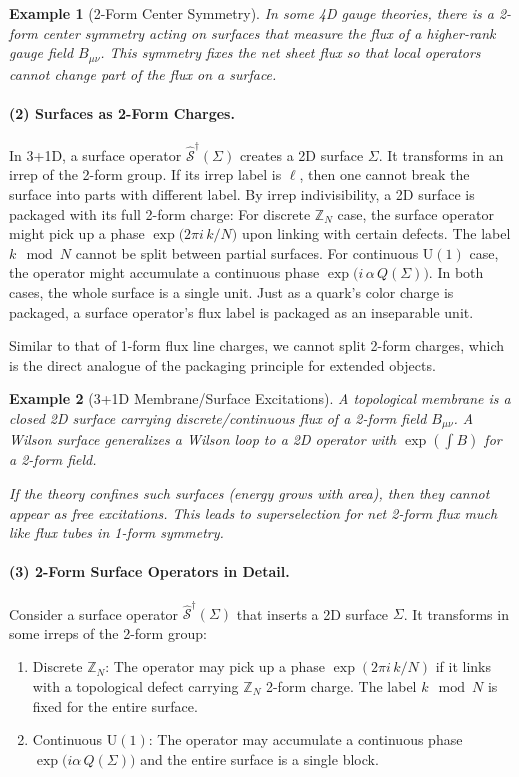 \documentclass[12pt,a4paper]{article}
\newtheorem{example}{Example}
\begin{document}
\begin{example}[2-Form Center Symmetry]
	In some 4D gauge theories, there is a 2-form center symmetry acting on surfaces that measure the flux of a higher-rank gauge field $B_{\mu\nu}$.
	This symmetry fixes the net sheet flux so that local operators cannot change part of the flux on a surface.
\end{example}


\paragraph{(2) Surfaces as 2-Form Charges.}
In 3+1D, a surface operator $\hat{\mathcal{S}}^\dagger(\Sigma)$ creates a 2D surface $\Sigma$.
It transforms in an irrep of the 2-form group.
If its irrep label is $\ell$, then one cannot break the surface into parts with different label.
By irrep indivisibility, a 2D surface is packaged with its full 2-form charge:
For discrete $\mathbb{Z}_N$ case, the surface operator might pick up a phase $\exp\bigl(2\pi i\,k/N\bigr)$ upon linking with certain defects.
The label $k \mod N$ cannot be split between partial surfaces.  
For continuous $\mathrm{U}(1)$ case, the operator might accumulate a continuous phase $\exp\bigl(i\,\alpha\,Q(\Sigma)\bigr)$.
In both cases, the whole surface is a single unit.
Just as a quark's color charge is packaged, a surface operator's flux label is packaged as an inseparable unit.

Similar to that of 1-form flux line charges, we cannot split 2-form charges, which is the direct analogue of the packaging principle for extended objects.


\begin{example}[3+1D Membrane/Surface Excitations]
	A topological membrane is a closed 2D surface carrying discrete/continuous flux of a 2-form field $B_{\mu\nu}$.  
	A Wilson surface generalizes a Wilson loop to a 2D operator with $\exp(\int B)$ for a 2-form field.  
	
	If the theory confines such surfaces (energy grows with area), then they cannot appear as free excitations.
	This leads to superselection for net 2-form flux much like flux tubes in 1-form symmetry.
\end{example}


\paragraph{(3) 2-Form Surface Operators in Detail.}
Consider a surface operator $\hat{\mathcal{S}}^\dagger(\Sigma)$ that inserts a 2D surface $\Sigma$.
It transforms in some irreps of the 2-form group:
\begin{enumerate}
	\item Discrete $\mathbb{Z}_N$:  
	The operator may pick up a phase $\exp(2\pi i\,k/N)$ if it links with a topological defect carrying $\mathbb{Z}_N$ 2-form charge.
	The label $k \mod N$ is fixed for the entire surface.
	
	\item Continuous $\mathrm{U}(1)$:  
	The operator may accumulate a continuous phase $\exp\bigl(i\alpha\,Q(\Sigma)\bigr)$ and the entire surface is a single block.
\end{enumerate}
\end{document}
